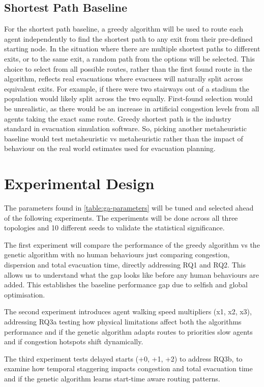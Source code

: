 \documentclass[12pt,a4paper]{report}
\begin{document}
\subsection{Shortest Path Baseline}
For the shortest path baseline, a greedy algorithm will be used to route each agent independently to find the shortest path to any exit from their pre-defined starting node. In the situation where there are multiple shortest paths to different exits, or to the same exit, a random path from the options will be selected. This choice to select from all possible routes, rather than the first found route in the algorithm, reflects real evacuations where evacuees will naturally split across equivalent exits. For example, if there were two stairways out of a stadium the population would likely split across the two equally. First-found selection would be unrealistic, as there would be an increase in artificial congestion levels from all agents taking the exact same route. Greedy shortest path is the industry standard in evacuation simulation software. So, picking another metaheuristic baseline would test metaheuristic vs metaheuristic rather than the impact of behaviour on the real world estimates used for evacuation planning.

\section{Experimental Design}
The parameters found in \autoref{table:ga-parameters} will be tuned and selected ahead of the following experiments. The experiments will be done across all three topologies and 10 different seeds to validate the statistical significance.

The first experiment will compare the performance of the greedy algorithm vs the genetic algorithm with no human behaviours just comparing congestion, dispersion and total evacuation time, directly addressing RQ1 and RQ2. This allows us to understand what the gap looks like before any human behaviours are added. This establishes the baseline performance gap due to selfish and global optimisation.

The second experiment introduces agent walking speed multipliers (x1, x2, x3), addressing RQ3a testing how physical limitations affect both the algorithms performance and if the genetic algorithm adapts routes to priorities slow agents and if congestion hotspots shift dynamically.

The third experiment tests delayed starts (+0, +1, +2) to address RQ3b, to examine how temporal staggering impacts congestion and total evacuation time and if the genetic algorithm learns start-time aware routing patterns.
\end{document}
